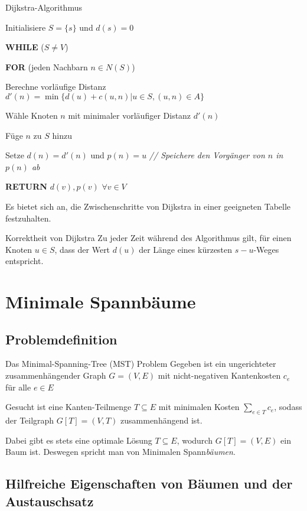 \documentclass{panikzettel}
\newcommand\tab[1][1cm]{\hspace*{#1}}
\begin{document}
{\begin{algo}{Dijkstra-Algorithmus }
	\tcblower
	
	Initialisiere $S = \{s\}$ und $d(s) = 0$
	
	\textbf{WHILE} ($S \neq V$)
	
	\tab \textbf{FOR} (jeden Nachbarn $n \in N(S)$)
	
	\tab\tab Berechne vorläufige Distanz $d'(n) = \min \{d(u) + c(u,n) | u \in S, (u,n) \in A \}$
	
	\tab Wähle Knoten $n$ mit minimaler vorläufiger Distanz $d'(n)$
	
	\tab Füge $n$ zu $S$ hinzu
	
	\tab Setze $d(n) = d'(n)$ und $p(n) = u$ \textit{ \color{gray} // Speichere den Vorgänger von $n$ in $p(n)$ ab }
	
	\textbf{RETURN} $d(v), p(v)$ $\forall v \in V$
\end{algo}

Es bietet sich an, die Zwischenschritte von Dijkstra in einer geeigneten Tabelle festzuhalten.

\begin{theo}{Korrektheit von Dijkstra}
	Zu jeder Zeit während des Algorithmus gilt, für einen Knoten $u \in S$, dass der Wert $d(u)$ der Länge eines kürzesten $s-u$-Weges entspricht.	
\end{theo}

\section{Minimale Spannbäume}

\subsection{Problemdefinition}

\begin{defi}{Das Minimal-Spanning-Tree (MST) Problem}
	Gegeben ist ein ungerichteter zusammenhängender Graph $G= (V,E)$ mit nicht-negativen Kantenkosten $c_e$ für alle $e \in E$
	
	Gesucht ist eine Kanten-Teilmenge $T \subseteq E$ mit minimalen Kosten $\sum_{e \in T} c_e$, sodass der Teilgraph $G[T] = (V,T)$ zusammenhängend ist. 
	
	Dabei gibt es stets eine optimale Lösung $T \subseteq E$, wodurch $G[T] = (V,E)$ ein Baum ist. Deswegen spricht man von Minimalen Spann\emph{bäumen}.
\end{defi}

\subsection{Hilfreiche Eigenschaften von Bäumen und der Austauschsatz}

}
\end{document}
